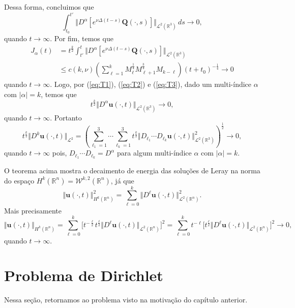 \documentclass[a4paper, 11pt]{book}
\theoremstyle{definition}
\newcommand{\bR}{\mathbb{R}}
\newcommand{\bu}{\mathbf{u}}
\newcommand{\BQ}{\mathbf{Q}}
\newcommand{\cL}{\mathcal{L}}
\newcommand{\cW}{\mathcal{W}}
\begin{document}
\begin{prf}
    Dessa forma, concluimos que
    \begin{equation} \label{eq:T2}
        \int_{t_0}^{t'} \Vert D^\alpha [e^{\nu\Delta (t-s)}\BQ(\cdot,s)] \Vert_{\cL^2(\bR^3)} \,ds  \to 0,
    \end{equation}
    quando $t \to \infty$. 
    Por fim, temos que
    \begin{equation} \label{eq:T3}
        \begin{aligned}
            J_\alpha(t) &= t^{\frac{k}{2}} \int_{t'}^t \Vert D^\alpha[e^{\nu\Delta(t-s)}\BQ(\cdot,s)] \Vert_{\cL^2(\bR^3)} \\
            &\leqslant c(k,\nu) \left( \sum_{\ell=1}^k M_\ell^{\frac{1}{4}} M_{\ell+1}^{\frac{3}{4}} M_{k-\ell} \right) (t + t_0)^{-\frac{1}{4}} \to 0
        \end{aligned}
    \end{equation}
    quando $t \to \infty$. Logo, por (\ref{eq:T1}), (\ref{eq:T2}) e (\ref{eq:T3}), dado um multi-índice $\alpha$ com $|\alpha| = k$, temos que
    \[
        t^{\frac{k}{2}} \Vert D^\alpha \bu(\cdot,t) \Vert_{\cL^2(\bR^3)} \to 0,
    \]
    quando $t \to \infty$.
    Portanto
    \[
        t^{\frac{k}{2}} \Vert D^k \bu(\cdot,t) \Vert_{\cL^2} = \left( \sum_{\ell_1=1}^{3} \cdots \sum_{\ell_k=1}^3 t^{\frac{k}{2}} \Vert D_{\ell_1} \cdots D_{\ell_k} \bu(\cdot,t) \Vert_{\cL^2(\bR^3)}^2 \right)^{\frac{1}{2}} \to 0,
    \]
    quando $t \to \infty$ pois, $D_{\ell_1} \cdots D_{\ell_k} = D^\alpha$ para algum multi-índice $\alpha$ com $|\alpha| = k$.
\end{prf}


O teorema acima mostra o decaimento de energia das soluções de Leray na norma do espaço $H^k(\bR^n) = \cW^{k,2}(\bR^n)$, já que
\[
    \Vert \bu(\cdot,t) \Vert_{H^k(\bR^n)}^2 = \sum_{\ell = 0}^k \Vert D^\ell\bu(\cdot,t) \Vert_{\cL^2(\bR^n)}^2.
\]
Mais precisamente
\[
    \Vert \bu(\cdot,t) \Vert_{H^k(\bR^n)} = \sum_{\ell = 0}^k \big[ t^{-\frac{\ell}{2}} t^{\frac{\ell}{2}} \Vert D^\ell \bu(\cdot,t) \Vert_{\cL^2(\bR^n)} \big]^2 = \sum_{\ell = 0}^k t^{-\ell} \big[ t^{\frac{\ell}{2}} \Vert D^\ell \bu(\cdot,t) \Vert_{\cL^2(\bR^n)} \big]^2 \to 0,
\]
quando $t \to \infty$.

\section{Problema de Dirichlet} \label{sec:dirichlet}

Nessa seção, retornamos ao problema visto na motivação do capítulo anterior.
\end{document}
